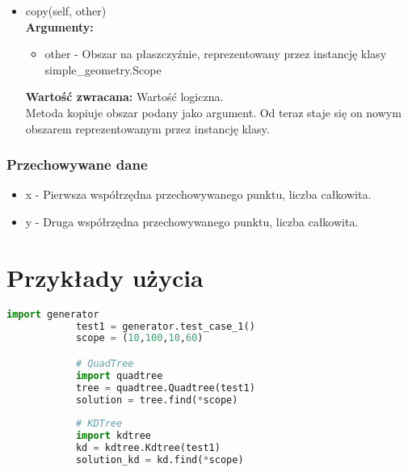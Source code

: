 \documentclass{article}
\begin{document}
\begin{itemize}
                    
                    \item copy(self, other)\\
                        \textbf{Argumenty:} \begin{itemize}
                                \item other - Obszar na płaszczyźnie, reprezentowany przez instancję klasy simple\_geometry.Scope
                            \end{itemize}
                        \textbf{Wartość zwracana:} Wartość logiczna. \\
                        Metoda kopiuje obszar  podany jako argument. Od teraz staje się on nowym obszarem reprezentowanym przez instancję klasy.  
                    
                \end{itemize}
            \subsubsection{Przechowywane dane}
            \begin{itemize}
                \item x - Pierwsza współrzędna przechowywanego punktu, liczba całkowita.
                \item y - Druga współrzędna przechowywanego punktu, liczba całkowita. 
            \end{itemize}

    \section{Przykłady użycia}
        \begin{lstlisting}[language=Python]
            import generator 
            test1 = generator.test_case_1()
            scope = (10,100,10,60)

            # QuadTree
            import quadtree
            tree = quadtree.Quadtree(test1)
            solution = tree.find(*scope)
            
            # KDTree 
            import kdtree
            kd = kdtree.Kdtree(test1)
            solution_kd = kd.find(*scope)
        \end{lstlisting}    
\end{document}
